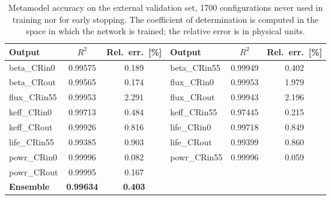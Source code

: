 \begin{table}[htbp]
\centering
\caption{Metamodel accuracy on the external validation set, 1700 configurations
never used in training nor for early stopping. The coefficient of determination
is computed in the space in which the network is trained; the relative error is
in physical units.}
\label{tab:accuracy}
\begin{tabular}{lcc|lcc}
\hline
Output & $R^2$ & Rel.\ err.\ [\%] & Output & $R^2$ & Rel.\ err.\ [\%] \\ \hline
    beta\_CRin0 & 0.99575 & 0.189 & beta\_CRin55 & 0.99949 & 0.402 \\
    beta\_CRout & 0.99565 & 0.174 & flux\_CRin0 & 0.99953 & 1.979 \\
    flux\_CRin55 & 0.99953 & 2.291 & flux\_CRout & 0.99943 & 2.196 \\
    keff\_CRin0 & 0.99713 & 0.484 & keff\_CRin55 & 0.97445 & 0.215 \\
    keff\_CRout & 0.99926 & 0.816 & life\_CRin0 & 0.99718 & 0.849 \\
    life\_CRin55 & 0.99385 & 0.903 & life\_CRout & 0.99399 & 0.860 \\
    powr\_CRin0 & 0.99996 & 0.082 & powr\_CRin55 & 0.99996 & 0.059 \\
    powr\_CRout & 0.99995 & 0.167 & & & \\ \hline
    \textbf{Ensemble} & \textbf{0.99634} & \textbf{0.403} & & & \\ \hline
\end{tabular}
\end{table}
